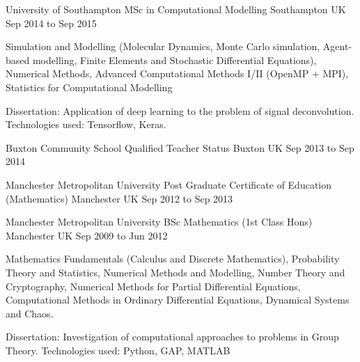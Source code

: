 

\begin{cventries}

  \cventry
    {University of Southampton} %
    {MSc in Computational Modelling} %
    {Southampton UK} %
    {Sep 2014 to Sep 2015} %
    {
      \begin{cvitems} %
        \item {Simulation and Modelling (Molecular Dynamics, Monte Carlo simulation, Agent-based modelling, Finite Elements and Stochastic Differential Equations), Numerical Methods, Advanced Computational Methods I/II (OpenMP + MPI), Statistics for Computational Modelling}
        \item {Dissertation: Application of deep learning to the problem of signal deconvolution. Technologies used: Tensorflow, Keras.}
      \end{cvitems}
    }

  \cventry
    {Buxton Community School} %
    {Qualified Teacher Status} %
    {Buxton UK} %
    {Sep 2013 to Sep 2014} %
    {}

  \cventry
    {Manchester Metropolitan University} %
    {Post Graduate Certificate of Education (Mathematics)} %
    {Manchester UK} %
    {Sep 2012 to Sep 2013} %
    {}

  \cventry
    {Manchester Metropolitan University} %
    {BSc Mathematics (1st Class Hons)} %
    {Manchester UK} %
    {Sep 2009 to Jun 2012} %
    {
      \begin{cvitems} %
        \item {Mathematics Fundamentals (Calculus and Discrete Mathematics), Probability Theory and Statistics, Numerical Methods and Modelling, Number Theory and Cryptography, Numerical Methods for Partial Differential Equations, Computational Methods in Ordinary Differential Equations, Dynamical Systems and Chaos.}
        \item {Dissertation: Investigation of computational approaches to problems in Group Theory. Technologies used: Python, GAP, MATLAB}
      \end{cvitems}}

\end{cventries}
